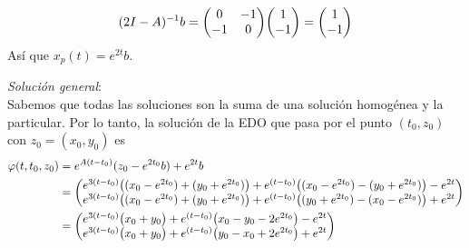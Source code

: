 \begin{sol}[Demostración]
\begin{enumerate}[label = (\alph*)]
\[(2I-A)^{-1}b = \mqty(0&-1\\-1&0)\mqty(1\\-1) = \mqty(1\\-1)
\]
Así que $x_p(t) = e^{2t}b$.\par\vspace{1em}
\emph{Solución general}:\\
Sabemos que todas las soluciones son la suma de una solución homogénea y la particular. Por lo tanto, la solución de la EDO que pasa por el punto $(t_0,z_0)$ con $z_0 = (x_0,y_0)$ es
\begin{align*}
\varphi(t,t_0,z_0)%
&= e^{A(t-t_0)}(z_0-e^{2t_0}b) + e^{2t}b\\
&= \mqty(%
    e^{3(t-t_0)}\big((x_0 - e^{2t_0}) + (y_0 + e^{2t_0})\big) + e^{(t-t_0)}\big((x_0 - e^{2t_0})-(y_0 + e^{2t_0})\big) - e^{2t}\\
    e^{3(t-t_0)}\big((x_0 - e^{2t_0})+(y_0 + e^{2t_0})\big) + e^{(t-t_0)}\big((y_0 + e^{2t_0})-(x_0 - e^{2t_0})\big) + e^{2t}
)\\
&= \mqty(%
    e^{3(t-t_0)}\big(x_0 + y_0\big) + e^{(t-t_0)}\big(x_0 - y_0 - 2e^{2t_0}\big) - e^{2t}\\
    e^{3(t-t_0)}\big(x_0 + y_0\big) + e^{(t-t_0)}\big(y_0 - x_0 + 2e^{2t_0}\big) + e^{2t}
)
\end{align*}
\end{enumerate}
\end{sol}

